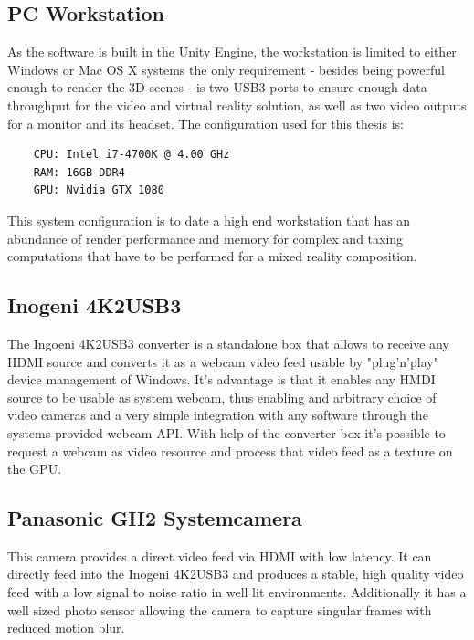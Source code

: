 \subsection{PC Workstation}

As the software is built in the Unity Engine, the workstation is limited to 
either Windows or Mac OS X systems the only requirement - besides being 
powerful enough to render the 3D scenes - is two USB3 ports to ensure enough 
data throughput for the video and virtual reality solution, as well as two 
video outputs for a monitor and its headset.
\newline
The configuration used for this thesis is:
\begin{lstlisting}
	CPU: Intel i7-4700K @ 4.00 GHz
	RAM: 16GB DDR4
	GPU: Nvidia GTX 1080
\end{lstlisting}

This system configuration is to date a high end workstation that has an 
abundance of render performance and memory for complex and taxing computations 
that have to be performed for a mixed reality composition. 

\subsection{Inogeni 4K2USB3}
The Ingoeni 4K2USB3 converter is a standalone box that allows to receive any 
HDMI source and converts it as a webcam video feed usable by "plug'n'play" 
device management of Windows. It's advantage is that it enables any HMDI source 
to be usable as system webcam, thus enabling and arbitrary choice of video 
cameras and a very simple integration with any software through the systems 
provided webcam API. With help of the converter box it's possible to request a 
webcam as video resource and process that video feed as a texture on the GPU.

\subsection{Panasonic GH2 Systemcamera}
This camera provides a direct video feed via HDMI with low latency. It can 
directly feed into the Inogeni 4K2USB3 and produces a stable, high quality 
video feed with a low signal to noise ratio in well lit environments. 
Additionally it has a well sized photo sensor allowing the camera to capture 
singular frames with reduced motion blur.

